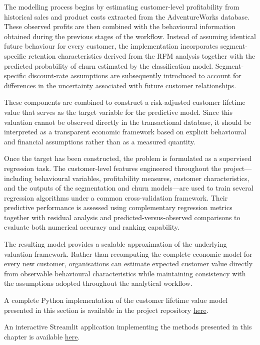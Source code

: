 \documentclass[
  12pt,
  letterpaper,
]{book}
\begin{document}
The modelling process begins by estimating customer-level profitability
from historical sales and product costs extracted from the
AdventureWorks database. These observed profits are then combined with
the behavioural information obtained during the previous stages of the
workflow. Instead of assuming identical future behaviour for every
customer, the implementation incorporates segment-specific retention
characteristics derived from the RFM analysis together with the
predicted probability of churn estimated by the classification model.
Segment-specific discount-rate assumptions are subsequently introduced
to account for differences in the uncertainty associated with future
customer relationships.

These components are combined to construct a risk-adjusted customer
lifetime value that serves as the target variable for the predictive
model. Since this valuation cannot be observed directly in the
transactional database, it should be interpreted as a transparent
economic framework based on explicit behavioural and financial
assumptions rather than as a measured quantity.

Once the target has been constructed, the problem is formulated as a
supervised regression task. The customer-level features engineered
throughout the project---including behavioural variables, profitability
measures, customer characteristics, and the outputs of the segmentation
and churn models---are used to train several regression algorithms under
a common cross-validation framework. Their predictive performance is
assessed using complementary regression metrics together with residual
analysis and predicted-versus-observed comparisons to evaluate both
numerical accuracy and ranking capability.

The resulting model provides a scalable approximation of the underlying
valuation framework. Rather than recomputing the complete economic model
for every new customer, organisations can estimate expected customer
value directly from observable behavioural characteristics while
maintaining consistency with the assumptions adopted throughout the
analytical workflow.

A complete Python implementation of the customer lifetime value model
presented in this section is available in the project repository
\href{https://github.com/rodrigokang/portfolio/tree/main/notebooks-and-scripts/2-retail-analytics/2-customer-value-and-retention}{here}.

An interactive Streamlit application implementing the methods presented
in this chapter is available
\href{https://github.com/rodrigokang/portfolio/tree/main/notebooks-and-scripts/2-retail-analytics/2-customer-value-and-retention/dashboard}{here}.
\end{document}
